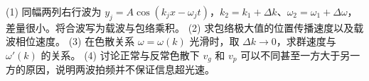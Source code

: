 (1) 同幅两列右行波为 \(y_j=A\cos(k_jx-\omega_jt)\)，\(k_2=k_1+\Delta k\)、\(\omega_2=\omega_1+\Delta\omega\)，差量很小。将合波写为载波与包络乘积。
(2) 求包络极大值的位置传播速度以及载波相位速度。
(3) 在色散关系 \(\omega=\omega(k)\) 光滑时，取 \(\Delta k\to0\)，求群速度与 \(\omega'(k)\) 的关系。
(4) 讨论正常与反常色散下 \(v_g\) 和 \(v_p\) 可以不同甚至一方大于另一方的原因，说明两波拍频并不保证信息超光速。
